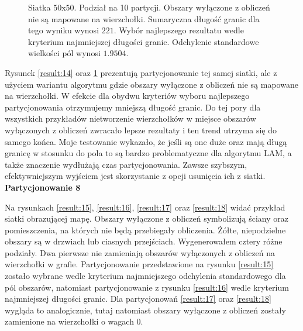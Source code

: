 \begin{figure}[h]
\begin{subfigure}{.33\textwidth}
    \caption[short]{}
\end{subfigure}
\caption{Siatka $50$x$50$. Podział na 10 partycji.
Obszary wyłączone z obliczeń nie są mapowane na wierzchołki.
Sumaryczna długość granic dla tego wyniku wynosi $221$.
Wybór najlepszego rezultatu wedle kryterium najmniejszej długości granic.
Odchylenie standardowe wielkości pól wynosi $1.9504$.}
\label{result:13}
\end{figure}
Rysunek \ref{result:14} oraz \ref{result:13} prezentują partycjonowanie tej samej siatki, ale z użyciem wariantu algorytmu
gdzie obszary wyłączone z obliczeń nie są mapowane na wierzchołki.
W efekcie dla obydwu kryteriów wyboru najlepszego partycjonowania otrzymujemy mniejszą długość granic.
Do tej pory dla wszystkich przykładów nietworzenie wierzchołków w miejsce obszarów wyłączonych z obliczeń
zwracało lepsze rezultaty i ten trend utrzyma się do samego końca.
Moje testowanie wykazało, że jeśli są one duże oraz mają długą granicę w stosunku do pola to są bardzo
problematyczne dla algorytmu LAM, a także znaczenie wydłużają czas partycjonowania.
Zawsze szybszym, efektywniejszym wyjściem jest skorzystanie z opcji usunięcia ich z siatki.
\FloatBarrier
\vspace{3mm}
\textbf{Partycjonowanie 8}
\vspace{1mm}

Na rysunkach \ref{result:15}, \ref{result:16}, \ref{result:17} oraz \ref{result:18} widać przykład siatki obrazującej
mapę.
Obszary wyłączone z obliczeń symbolizują ściany oraz pomieszczenia, na których nie będą przebiegały obliczenia.
Żółte, niepodzielne obszary są w drzwiach lub ciasnych przejściach.
Wygenerowałem cztery różne podziały.
Dwa pierwsze nie zamieniają obszarów wyłączonych z obliczeń na wierzchołki w grafie.
Partycjonowanie przedstawione na rysunku \ref{result:15} zostało wybrane wedle kryterium najmniejszego odchylenia standardowego dla pól obszarów,
natomiast partycjonowanie z rysunku \ref{result:16} wedle kryterium najmniejszej długości granic.
Dla partycjonowań \ref{result:17} oraz \ref{result:18} wygląda to analogicznie, tutaj natomiast obszary wyłączone z obliczeń
zostały zamienione na wierzchołki o wagach $0$.

